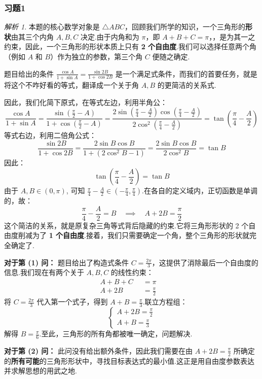 \documentclass[12pt,a4paper]{ctexbook}
\theoremstyle{definition}
\theoremstyle{remark}
\newtheorem*{solution}{解析}
\begin{document}
	\subsubsection{习题1}
	\begin{solution}
		本题的核心数学对象是 $\triangle ABC$，回顾我们所学的知识，一个三角形的\textbf{形状}由其三个内角 $A, B, C$ 决定.由于内角和为 $\pi$，即 $A+B+C=\pi$，，是为其一之约束，因此，一个三角形的形状本质上只有 \textbf{2 个自由度}.我们可以选择任意两个角（例如 $A$ 和 $B$）作为独立的参数，第三个角 $C$ 便随之确定.
		
		题目给出的条件 $\frac{\cos A}{1+\sin A} = \frac{\sin 2B}{1+\cos 2B}$ 是一个满足式条件，而我们的首要任务，就是将这个不咋好看的等式，翻译成一个关于角 $A, B$ 的更简洁的关系式.
		
		因此，我们化简下原式，在等式左边，利用半角公：
		\[
		\frac{\cos A}{1+\sin A} = \frac{\sin(\frac{\pi}{2}-A)}{1+\cos(\frac{\pi}{2}-A)} = \frac{2\sin(\frac{\pi}{4}-\frac{A}{2})\cos(\frac{\pi}{4}-\frac{A}{2})}{2\cos^2(\frac{\pi}{4}-\frac{A}{2})} = \tan\left(\frac{\pi}{4}-\frac{A}{2}\right)
		\]
		等式右边，利用二倍角公式：
		\[
		\frac{\sin 2B}{1+\cos 2B} = \frac{2\sin B \cos B}{1+(2\cos^2 B-1)} = \frac{2\sin B \cos B}{2\cos^2 B} = \tan B
		\]
		因此：
		\[
		\tan\left(\frac{\pi}{4}-\frac{A}{2}\right) = \tan B
		\]
		由于 $A, B \in (0, \pi)$, 可知 $\frac{\pi}{4}-\frac{A}{2} \in (-\frac{\pi}{4}, \frac{\pi}{4})$.在各自的定义域内，正切函数是单调的，故：
		\[
		\frac{\pi}{4}-\frac{A}{2} = B \quad \implies \quad A+2B = \frac{\pi}{2}
		\]
		这个简洁的关系，就是原复杂三角等式背后隐藏的约束.它将三角形形状的 2 个自由度削减为了 \textbf{1 个自由度}.接着，我们只需要确定一个角，整个三角形的形状就完全确定了.
		
		\textbf{对于第 (1) 问：}
		题目给出了构造式条件 $C = \frac{2\pi}{3}$，这提供了消除最后一个自由度的信息.我们现在有两个关于 $A, B, C$ 的线性约束：
		\begin{align*}
			A+B+C &= \pi \quad  \\
			A+2B \qquad &= \frac{\pi}{2} \quad 
		\end{align*}
		将 $C=\frac{2\pi}{3}$ 代入第一个式子，得到 $A+B = \frac{\pi}{3}$.联立方程组：
		\[
		\begin{cases}
			A+2B = \frac{\pi}{2} \\
			A+B = \frac{\pi}{3}
		\end{cases}
		\]
		解得 $B = \frac{\pi}{6}$.至此，三角形的所有角都被唯一确定，问题解决.
		
		\textbf{对于第 (2) 问：}
		此问没有给出额外条件，因此我们需要在由 $A+2B=\frac{\pi}{2}$ 所确定的\textbf{所有可能}的三角形形状中，寻找目标表达式的最小值.这正是用自由度参数表达并求解思想的用武之地.
		

\end{solution}
\end{document}
